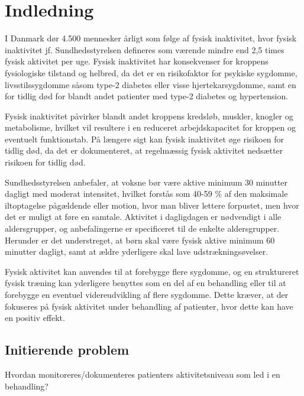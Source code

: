 \chapter{Indledning}
I Danmark dør 4.500 mennesker årligt som følge af fysisk inaktivitet, hvor fysisk inaktivitet jf. Sundhedsstyrelsen defineres som værende mindre end 2,5 times fysisk aktivitet per uge. \citep{aagaard2014} Fysisk inaktivitet har konsekvenser for kroppens fysiologiske tilstand og helbred, da det er en risikofaktor for psykiske sygdomme, livsstilssygdomme såsom type-2 diabetes eller visse hjertekarsygdomme, samt en for tidlig død for blandt andet patienter med type-2 diabetes og hypertension. \citep{motionsraad2007} 

Fysisk inaktivitet påvirker blandt andet kroppens kredsløb, muskler, knogler og metabolisme, hvilket vil resultere i en reduceret arbejdskapacitet for kroppen og eventuelt funktionstab. På længere sigt kan fysisk inaktivitet øge risikoen for tidlig død, da det er dokumenteret, at regelmæssig fysisk aktivitet nedsætter risikoen for tidlig død. \citep{motionsraad2007}

Sundhedsstyrelsen anbefaler, at voksne bør være aktive minimum 30 minutter dagligt med moderat intensitet, hvilket forstås som 40-59 $\%$ af den maksimale iltoptagelse pågældende eller motion, hvor man bliver lettere forpustet, men hvor det er muligt at føre en samtale.
Aktivitet i dagligdagen er nødvendigt i alle aldersgrupper, og anbefalingerne er specificeret til de enkelte aldersgrupper. Herunder er det understreget, at børn skal være fysisk aktive minimum 60 minutter dagligt, samt at ældre yderligere skal lave udstrækningsøvelser. \citep{pedersen2011}

Fysisk aktivitet kan anvendes til at forebygge flere sygdomme, og en struktureret fysisk træning kan yderligere benyttes som en del af en behandling eller til at forebygge en eventuel videreudvikling af flere sygdomme. \citep{motionsraad2007} Dette kræver, at der fokuseres på fysisk aktivitet under behandling af patienter, hvor dette kan have en positiv effekt.



\section{Initierende problem}
Hvordan monitoreres/dokumenteres patienters aktivitetsniveau som led i en behandling?  

